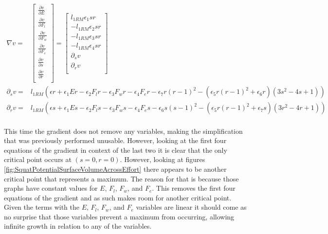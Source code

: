 \begin{equation*}
	\begin{split}
		\nabla v = & \left[\begin{matrix}
			\frac{\partial v}{\partial E} \\
			\frac{\partial v}{\partial F_l} \\
			\frac{\partial v}{\partial F_w} \\
			\frac{\partial v}{\partial F_e} \\
			\frac{\partial v}{\partial s} \\
			\frac{\partial v}{\partial r} \\
		\end{matrix}\right]=
		\left[\begin{matrix}
			l_{1RM} \epsilon_1 sr \\
			-l_{1RM} \epsilon_2 sr \\
			-l_{1RM} \epsilon_3 sr \\
			-l_{1RM} \epsilon_4 sr \\
			\partial_s v \\
			\partial_r v\\
		\end{matrix}\right] \\
		\partial_s v = & l_{1RM} \left(
			\epsilon r+
			\epsilon_1 Er-
			\epsilon_2 F_l r-
			\epsilon_3 F_w r-
			\epsilon_4 F_e r-
			\epsilon_7 r(r-1)^2	-
			\left( 
				\epsilon_5 r(r-1)^2+\epsilon_6 r
			\right)	
			(3s^2-4s+1)
		\right) \\
		\partial_r v = & l_{1RM} \left(
			\epsilon s+
			\epsilon_1 Es-
			\epsilon_2 F_l s-
			\epsilon_3 F_w s-
			\epsilon_4 F_e s-
			\epsilon_6 s(s-1)^2	-
			\left( 
				\epsilon_5 r(r-1)^2+\epsilon_7 s
			\right)	
			(3r^2-4r+1)
		\right) \\
	\end{split}
\end{equation*}

This time the gradient does not remove any variables, making the simplification that was previously performed unusable. However, looking at the first four equations of the gradient in context of the last two it is clear that the only critical point occurs at $(s=0,r=0)$. However, looking at figures \ref{fig:SquatPotentialSurfaceVolumeAcrossEffort} there appears to be another critical point that represents a maximum. The reason for that is because those graphs have constant values for $E$, $F_l$, $F_w$, and $F_e$. This removes the first four equations of the gradient and as such makes room for another critical point. Given the terms with the $E$, $F_l$, $F_w$, and $F_e$ variables are linear it should come as no surprise that those variables prevent a maximum from occurring, allowing infinite growth in relation to any of the variables.

